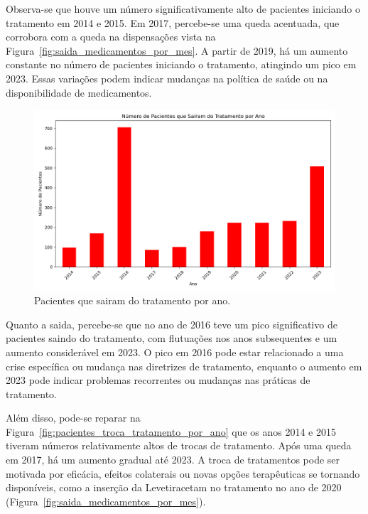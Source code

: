\documentclass[article,a4paper,12pt,brazil,sumario=tradicional]{abntex2}
\begin{document}
Observa-se que houve um número significativamente alto de pacientes iniciando o tratamento em 2014 e 2015. Em 2017, percebe-se uma queda acentuada, que corrobora com a queda na dispensações vista na Figura~\ref{fig:saida_medicamentos_por_mes}. A partir de 2019, há um aumento constante no número de pacientes iniciando o tratamento, atingindo um pico em 2023. Essas variações podem indicar mudanças na política de saúde ou na disponibilidade de medicamentos.

\begin{figure}[!ht]
    \centering
    \includegraphics[width=1\textwidth]{pacientes_sairam_tratamento_por_ano.png}
    \caption{Pacientes que sairam do tratamento por ano.}
    \label{fig:pacientes_sairam_tratamento_por_ano}
\end{figure}

Quanto a saida, percebe-se que no ano de 2016 teve um pico significativo de pacientes saindo do tratamento, com flutuações nos anos subsequentes e um aumento considerável em 2023. O pico em 2016 pode estar relacionado a uma crise específica ou mudança nas diretrizes de tratamento, enquanto o aumento em 2023 pode indicar problemas recorrentes ou mudanças nas práticas de tratamento.

Além disso, pode-se reparar na Figura~\ref{fig:pacientes_troca_tratamento_por_ano} que os anos 2014 e 2015 tiveram números relativamente altos de trocas de tratamento. Após uma queda em 2017, há um aumento gradual até 2023. A troca de tratamentos pode ser motivada por eficácia, efeitos colaterais ou novas opções terapêuticas se tornando disponíveis, como a inserção da Levetiracetam no tratamento no ano de 2020 (Figura~\ref{fig:saida_medicamentos_por_mes}).
\end{document}
